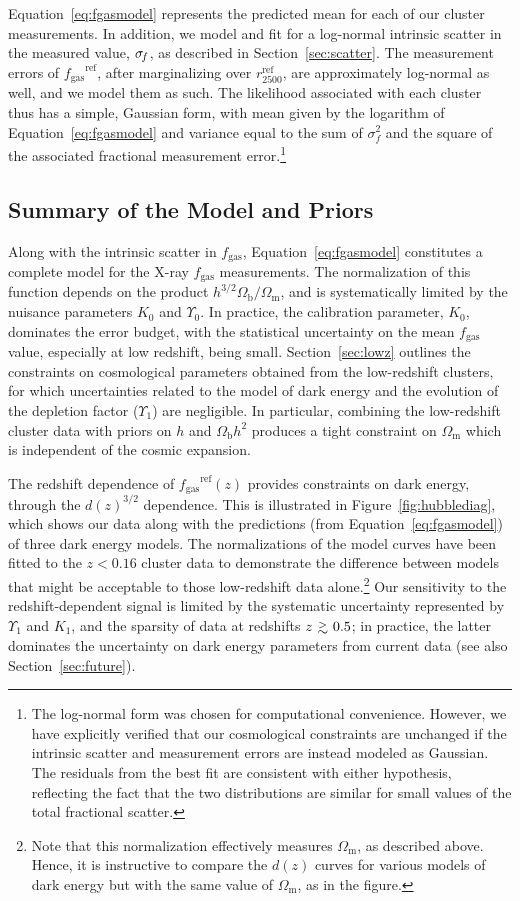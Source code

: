 \documentclass[useAMS,usenatbib,usegraphicx]{mn2e}
\newcommand*{\mysub}[2]{\ensuremath{#1_{\mathrm{#2}}}}
\newcommand*{\Omegam}{\mysub{\Omega}{m}}
\newcommand*{\Omegab}{\mysub{\Omega}{b}}
\newcommand*{\fgas}{\mysub{f}{gas}}
\newcommand*{\sigmaf}{\ensuremath{\sigma_{\hspace{-0.25ex}f}}}
\newcommand*{\gtsim}{\ {\raise-.75ex\hbox{$\buildrel>\over\sim$}}\ }
\newcommand*{\secref}{Section}
\newcommand*{\eqnref}{Equation}
\newcommand*{\figref}{Figure}
\begin{document}
\eqnref~\ref{eq:fgasmodel} represents the predicted mean for each of our cluster measurements. In addition, we model and fit for a log-normal intrinsic scatter in the measured value, $\sigmaf$, as described in \secref~\ref{sec:scatter}. The measurement errors of $\fgas^\mathrm{ref}$, after marginalizing over $r^\mathrm{ref}_{2500}$, are approximately log-normal as well, and we model them as such. The likelihood associated with each cluster thus has a simple, Gaussian form, with mean given by the logarithm of \eqnref~\ref{eq:fgasmodel} and variance equal to the sum of $\sigma^2_f$ and the square of the associated fractional measurement error.\footnote{The log-normal form was chosen for computational convenience. However, we have explicitly verified that our cosmological constraints are unchanged if the intrinsic scatter and measurement errors are instead modeled as Gaussian. The residuals from the best fit are consistent with either hypothesis, reflecting the fact that the two distributions are similar for small values of the total fractional scatter.}


\subsection{Summary of the Model and Priors} \label{sec:modelsummary}

Along with the intrinsic scatter in \fgas{}, \eqnref~\ref{eq:fgasmodel} constitutes a complete model for the X-ray \fgas{} measurements. The normalization of this function depends on the product $h^{3/2}\Omegab/\Omegam$, and is systematically limited by the nuisance parameters $K_0$ and $\Upsilon_0$. In practice, the calibration parameter, $K_0$, dominates the error budget, with the statistical uncertainty on the mean \fgas{} value, especially at low redshift, being small. \secref~\ref{sec:lowz} outlines the constraints on cosmological parameters obtained from the low-redshift clusters, for which uncertainties related to the model of dark energy and the evolution of the depletion factor ($\Upsilon_1$) are negligible. In particular, combining the low-redshift cluster data with priors on $h$ and $\Omegab h^2$ produces a tight constraint on $\Omegam$ which is independent of the cosmic expansion.

The redshift dependence of $\fgas^\mathrm{ref}(z)$ provides constraints on dark energy, through the $d(z)^{3/2}$ dependence. This is illustrated in \figref~\ref{fig:hubblediag}, which shows our data along with the predictions (from \eqnref~\ref{eq:fgasmodel}) of three dark energy models. The normalizations of the model curves have been fitted to the $z<0.16$ cluster data to demonstrate the difference between models that might be acceptable to those low-redshift data alone.\footnote{Note that this normalization effectively measures \Omegam{}, as described above. Hence, it is instructive to compare the $d(z)$ curves for various models of dark energy but with the same value of \Omegam{}, as in the figure.} Our sensitivity to the redshift-dependent signal is limited by the systematic uncertainty represented by $\Upsilon_1$ and $K_1$, and the sparsity of data at redshifts $z \gtsim 0.5$; in practice, the latter dominates the uncertainty on dark energy parameters from current data (see also \secref~\ref{sec:future}).
\end{document}
